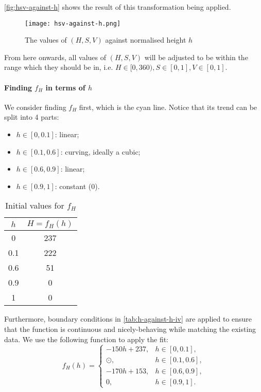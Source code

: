 \autoref{fig:hsv-against-h} shows the result of this transformation being applied.

\begin{figure}[htp]
    \centering
    \texttt{[image: hsv-against-h.png]}
    \caption{The values of \((H, S, V)\) against normalised height \(h\)}
    \label{fig:hsv-against-h}
\end{figure}

From here onwards, all values of \((H, S, V)\) will be adjusted to be within the range which they should be in, i.e. \(H \in [0, 360), S \in [0, 1], V \in [0, 1]\).

\paragraph{Finding \(f_H\) in terms of \(h\)}

We consider finding \(f_H\) first, which is the cyan line. Notice that its trend can be split into 4 parts:
\begin{itemize}
    \item \(h \in [0, 0.1]\): linear;
    \item \(h \in [0.1, 0.6]\): curving, ideally a cubic;
    \item \(h \in [0.6, 0.9]\): linear;
    \item \(h \in [0.9, 1]\): constant (0).
\end{itemize}

\begin{table}[htp]
    \centering

    \begin{tabular}{cc}
        \(h\) & \(H = f_H(h)\) \\
        \hline
        0     & 237            \\
        0.1   & 222            \\
        0.6   & 51             \\
        0.9   & 0              \\
        1     & 0
    \end{tabular}
    \caption{Initial values for \(f_H\)}
    \label{tab:h-against-h-iv}
\end{table}

Furthermore, boundary conditions in \autoref{tab:h-against-h-iv} are applied to ensure that the function is continuous and nicely-behaving while matching the existing data. We use the following function to apply the fit:
\[
    f_H(h) = \begin{cases}
        -150h + 237, & h \in [0, 0.1],   \\
        \odot,       & h \in [0.1, 0.6], \\
        -170h + 153, & h \in [0.6, 0.9], \\
        0,           & h \in [0.9, 1].
    \end{cases}
\]

